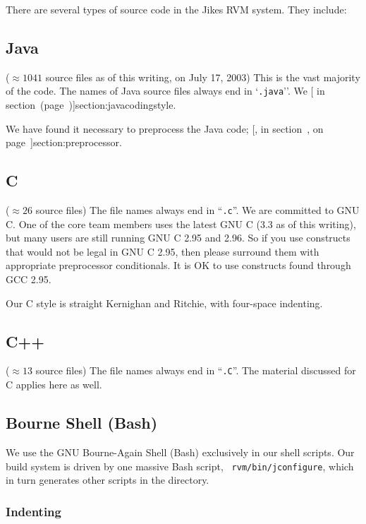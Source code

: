 There are several types of source code in the Jikes RVM system.  They
include:


\subsection{Java} 
($\approx 1041$ source files as of this writing, on July 17, 2003)  This is
the vast majority of the code.  The names of Java source files always end in
`{\tt .java}''.   We [ in
section~\Ref (page~\Pageref)]{section:javacodingstyle}. 

We have found it necessary to preprocess the Java code; [, in
  section~\Ref, on page~\Pageref]{section:preprocessor}.


\subsection {C}

($\approx 26$ source files)  The file names always
end in ``{\tt .c}''.  We are committed to GNU C.  One of the core team
members uses the latest GNU C (3.3 as of this writing), but many users
are still running GNU C 2.95 and 2.96.  So if you use constructs that
would not be legal in GNU C 2.95, then please surround them with
appropriate preprocessor conditionals.  It is OK to use constructs
found through GCC 2.95.

Our C style is straight Kernighan and Ritchie, with four-space
indenting.  

\subsection{C++} 

($\approx 13$ source files)  The file names always end in
``{\tt .C}''.   The material discussed for C applies here as well.

\subsection{Bourne Shell (Bash)}

We use the GNU Bourne-Again Shell (Bash) exclusively in our shell
scripts.  Our build system is driven by one massive Bash script, {\tt
rvm/bin/jconfigure}, which in turn generates other scripts in the
 directory.

\subsubsection{Indenting}

